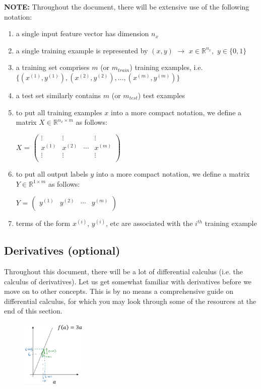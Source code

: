 \documentclass{article}[a4paper,12pt]
\theoremstyle{definition}
\begin{document}
\textbf{NOTE:} Throughout the document, there will be extensive use of the following notation:
\begin{enumerate}
	\item a single input feature vector has dimension $n_x$
	\item a single training example is represented by $(x,y)$ $\rightarrow$ $x\in\mathbb{R}^{n_x},$ $y\in\{0,1\}$
	\item a training set comprises $m$ (or $m_{train}$) training examples, i.e. $\{(x^{(1)},y^{(1)}), (x^{(2)},y^{(2)}), \dots, (x^{(m)},y^{(m)})\}$
	\item a test set similarly contains $m$ (or $m_{test}$) test examples
	\item to put all training examples $x$ into a more compact notation, we define a matrix $X\in\mathbb{R}^{n_x\times m}$ as follows:
\begin{center}
$X$ = 
$\begin{pmatrix}
	\vdots & \vdots & & \vdots\\
	x^{(1)} & x^{(2)} & \cdots & x^{(m)}\\
	\vdots & \vdots & & \vdots\\
\end{pmatrix}$
\end{center}
	\item to put all output labels $y$ into a more compact notation, we define a matrix $Y\in\mathbb{R}^{1\times m}$ as follows:
\begin{center}
$Y$ = 
$\begin{pmatrix}
	y^{(1)} & y^{(2)} & \cdots & y^{(m)}\\
\end{pmatrix}$
\end{center}
	\item terms of the form $x^{(i)}$, $y^{(i)}$, etc are associated with the $i^{th}$ training example
\end{enumerate}
\subsection{Derivatives (optional)}
Throughout this document, there will be a lot of differential calculus (i.e. the calculus of derivatives). Let us get somewhat familiar with derivatives before we move on to other concepts. This is by no means a comprehensive guide on differential calculus, for which you may look through some of the resources at the end of this section.

\begin{figure}
\centering \includegraphics[width=0.28\textwidth]{y_equals_3x.png}
\end{figure}
\vspace{6pt}
\end{document}
